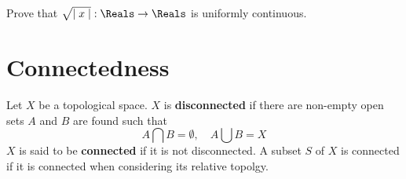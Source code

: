 


\begin{exercise}
    \item Prove that \(\sqrt{\mid x \mid} :\Reals \to \Reals\) is uniformly continuous.
\end{exercise}

\newpage
\section{Connectedness}
\begin{definition}
    Let \(X\) be a topological space. \(X\) is \textbf{disconnected} if there are non-empty open sets \(A\) and \( B\) are found such that
    \begin{equation*}
        A \bigcap B = \emptyset, \quad A \bigcup B = X
    \end{equation*}
    \(X\) is said to be \textbf{connected} if it is not disconnected. A subset \(S\) of \(X\) is connected if it is connected when considering its relative topolgy.
\end{definition}

